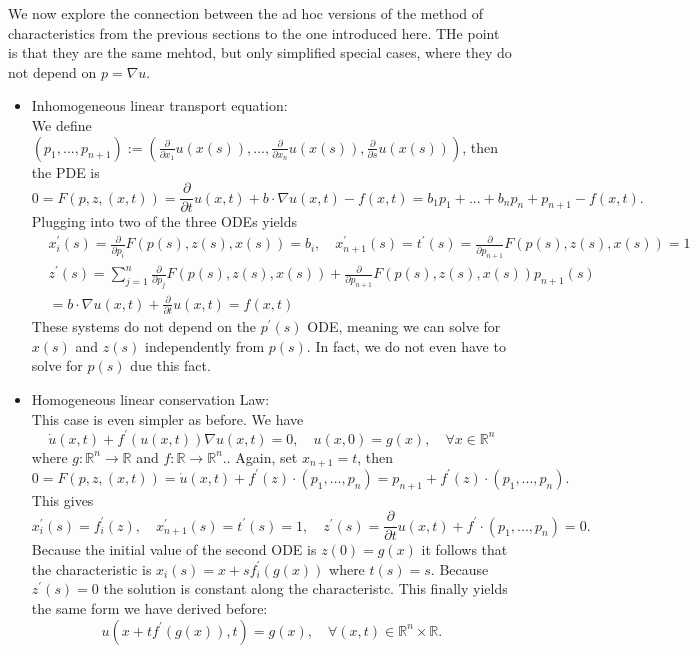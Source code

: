 \documentclass[A4,12pt,twoside]{book}
\begin{document}
We now explore the connection between the ad hoc versions of the method of characteristics from the previous sections to the one introduced here. THe point is that they are the same mehtod, but only simplified special cases, where they do not depend on $p= \nabla u$.
\begin{itemize}
    \item Inhomogeneous linear transport equation: \\
    We define $(p_1,...,p_{n+1}) := (\frac{\partial}{\partial x_1} u(x(s)),..., \frac{\partial}{\partial x_n} u(x(s)), \frac{\partial}{\partial s} u(x(s)) )$, then the PDE is 
    \[
    0= F(p,z,(x,t)) = \frac{\partial}{\partial t} u(x,t) + b \cdot \nabla u(x,t) -f(x,t)= b_1 p_1 +...+ b_n p_n + p_{n+1} - f(x,t).
    \]
    Plugging into two of the three ODEs yields 
    \begin{align*}
       & x_i^\prime (s) = \frac{\partial}{\partial p_i} F(p(s),z(s),x(s)) = b_i, \quad x_{n+1}^\prime (s) = t^\prime (s) = \frac{\partial}{\partial p_{n+1}} F(p(s),z(s),x(s)) = 1\\
        &z^\prime (s) = \sum_{j=1}^n \frac{\partial}{\partial p_j} F(p(s),z(s),x(s)) + \frac{\partial}{\partial p_{n+1}} F(p(s),z(s),x(s)) p_{n+1} (s)\\
        &= b \cdot \nabla u(x,t) + \frac{\partial}{\partial t} u(x,t)= f(x,t)
    \end{align*}
    These systems do not depend on the $p^\prime (s)$ ODE, meaning we can solve for $x(s)$ and $z(s)$ independently from $p(s)$. In fact, we do not even have to solve for $p(s)$ due this fact.
    \item Homogeneous linear conservation Law:\\
    This case is even simpler as before. We have 
    \[
    \dot{u} (x,t) + f^\prime (u(x,t)) \nabla u(x,t) =0,\quad u(x,0)=g(x), \quad \forall x \in \mathbb{R}^n
    \]
    where $g: \mathbb{R}^n \to \mathbb{R}$ and $f: \mathbb{R} \to \mathbb{R}^n$.. Again, set $x_{n+1} = t$, then 
    \[
    0= F(p,z,(x,t)) = \dot{u}(x,t) + f^\prime (z) \cdot (p_1,...,p_n) = p_{n+1} + f^\prime (z) \cdot (p_1,...,p_n).
    \]
    This gives 
    \[
    x_i^\prime (s) = f_i^\prime (z), \quad x_{n+1}^\prime (s) = t^\prime (s)=1, \quad z^\prime (s)= \frac{\partial}{\partial t} u(x,t) + f^\prime \cdot (p_1,...,p_n) =0.
    \]
    Because the initial value of the second ODE is $z(0)=g(x)$ it follows that the characteristic is $x_i (s) = x + s f_i^\prime (g(x))$ where $t(s)=s$. Because $z^\prime (s) =0$ the solution is constant along the characteristc. This finally yields the same form we have derived before:
    \[
    u(x+tf^\prime (g(x)),t) = g(x), \quad \forall (x,t) \in \mathbb{R}^n \times \mathbb{R}.
    \]
\end{itemize}
\end{document}
